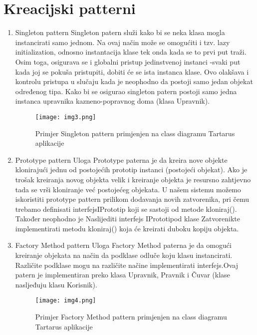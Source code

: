 \documentclass[12pt, a4paper]{report}
\theoremstyle{definition}
\begin{document}
\section *{Kreacijski patterni}
\begin{enumerate}

  \item  \large Singleton pattern \newline
  \normalsize
  Singleton patern služi kako bi se neka klasa mogla instancirati samo jednom. Na ovaj način može se omogućiti i tzv. lazy initialization, odnosno instantacija klase tek onda kada se to prvi put traži. Osim toga, osigurava se i globalni pristup jedinstvenoj instanci -svaki put kada joj se pokuša pristupiti, dobiti će se ista instanca klase. Ovo olakšava i kontrolu pristupa u slučaju kada je neophodno da postoji samo jedan objekat određenog tipa. Kako bi se osigurao singleton patern postoji samo jedna instanca upravnika kazneno-popravnog doma (klasa Upravnik).
      \begin{figure}[h]
\centering
\texttt{[image: img3.png]}
\caption{Primjer Singleton pattern primjenjen na class diagramu Tartarus aplikacije}
\end{figure}
  \item \large Prototype pattern \newline
  \normalsize
  Uloga Prototype paterna je da kreira nove objekte klonirajući jednu od postojećih prototip instanci (postojeći objekat). Ako je trošak kreiranja novog objekta velik i kreiranje objekta je resursno zahtjevno tada se vrši kloniranje već postojećeg objekata. U našem sistemu možemo iskoristiti prototype pattern prilikom dodavanja novih zatvorenika, pri čemu trebamo definisati interfejsIPrototip koji  se  sastoji  od  metode kloniraj(). Također neophodno je Naslijediti interfejs IPrototipod  klase Zatvorenikte  implementirati  metodu kloniraj() koja će kreirati duboku kopiju objekta.
   \item \large Factory Method pattern \newline
  \normalsize
  Uloga Factory Method paterna je da omogući kreiranje objekata na način da podklase odluče koju klasu instancirati. Različite podklase mogu na različite načine implementirati interfejs.Ovaj patern je implementiran preko klasa Upravnik, Pravnik i Čuvar (klase nasljeđuju klasu Korisnik).
        \begin{figure}[h]
\centering
\texttt{[image: img4.png]}
\caption{Primjer Factory Method pattern primjenjen na class diagramu Tartarus aplikacije}

\end{figure}
\end{enumerate}
\end{document}
